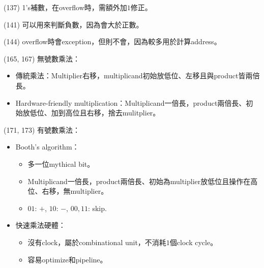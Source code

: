 \item \begin{theorem}{(137)} 1's補數，在overflow時，需額外加$1$修正。
\end{theorem}

\item \begin{theorem}{(141)} 可以用來判斷負數，因為會大於正數。
\end{theorem}

\item \begin{theorem}{(144)}  overflow時會exception，但則不會，因為較多用於計算address。
\end{theorem}

\item \begin{theorem}{(165, 167)} 無號數乘法：\begin{itemize}
        \item 傳統乘法：Multiplier右移，multiplicand初始放低位、左移且與product皆兩倍長。
        \item Hardware-friendly multiplication：Multiplicand一倍長，product兩倍長、初始放低位、加到高位且右移，捨去mulitplier。
    \end{itemize}
\end{theorem}

\item \begin{theorem}{(171, 173)} 有號數乘法：\begin{itemize}
        \item Booth's algorithm：\begin{itemize}
            \item 多一位mythical bit。
            \item Multiplicand一倍長，product兩倍長、初始為multiplier放低位且操作在高位、右移，無multiplier。
            \item $01$: $+$, $10$: $-$, $00, 11$: skip.
        \end{itemize}
        \item 快速乘法硬體：\begin{itemize}
            \item 沒有clock，屬於combinational unit，不消耗$1$個clock cycle。
            \item 容易optimize和pipeline。
        \end{itemize}
    \end{itemize}
\end{theorem}

